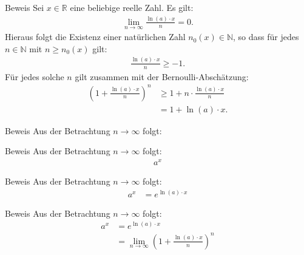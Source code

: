\documentclass[10pt]{beamer}
\def\bN{\mathbb{N}}
\def\bR{\mathbb{R}}
\begin{document}
\begin{frame}{Beweis}
    Sei \( x \in \bR \) eine beliebige reelle Zahl. Es gilt:
    \begin{align*}
        \lim_{n \to \infty} \frac{\ln( a ) \cdot x}{n} = 0. 
    \end{align*}
    Hieraus folgt die Existenz einer natürlichen Zahl \( n_{0}(x) \in \bN \), so dass für jedes \( n \in \bN \) mit \( n \geq n_{0}(x) \) gilt:
    \begin{align*}
        \frac{\ln( a ) \cdot x}{n} 
        \geq - 1.
    \end{align*}
    Für jedes solche \( n \) gilt zusammen mit der Bernoulli-Abschätzung:
    \begin{align*}
        \left( 1 + \frac{\ln( a ) \cdot x}{n} \right)^{n}
        & \geq 1 + n \cdot \frac{\ln( a ) \cdot x}{n} \\
        & = 1 + \ln( a ) \cdot x.
    \end{align*}
\end{frame}



\begin{frame}{Beweis}
    Aus der Betrachtung \( n \to \infty \) folgt:
\end{frame}



\begin{frame}{Beweis}
    Aus der Betrachtung \( n \to \infty \) folgt:
    \begin{align*}
        a^{x}
    \end{align*}
\end{frame}



\begin{frame}{Beweis}
    Aus der Betrachtung \( n \to \infty \) folgt:
    \begin{align*}
        a^{x}
        & = e^{\ln( a ) \cdot x}
    \end{align*}
\end{frame}



\begin{frame}{Beweis}
    Aus der Betrachtung \( n \to \infty \) folgt:
    \begin{align*}
        a^{x}
        & = e^{\ln( a ) \cdot x} \\
        & = \lim_{n \to \infty} \left( 1 + \frac{\ln( a ) \cdot x}{n} \right)^{n}
    \end{align*}
\end{frame}
\end{document}
